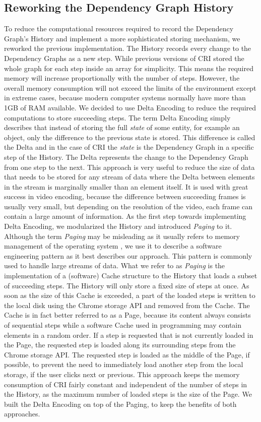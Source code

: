\subsection{Reworking the Dependency Graph History}
To reduce the computational resources required to record the Dependency Graph's History and implement a more sophisticated storing mechanism, we reworked the previous implementation. The History records every change to the Dependency Graphs as a new step. While previous versions of CRI stored the whole graph for each step inside an array for simplicity. This means the required memory will increase proportionally with the number of steps. However, the overall memory consumption will not exceed the limits of the environment except in extreme cases, because modern computer systems normally have more than 1GB of RAM available. We decided to use Delta Encoding to reduce the required computations to store succeeding steps. The term Delta Encoding simply describes that instead of storing the full \emph{state} of some entity, for example an object, only the difference to the previous state is stored. This difference is called the Delta and in the case of CRI the \emph{state} is the Dependency Graph in a specific step of the History. The Delta represents the change to the Dependency Graph from one step to the next. This approach is very useful to reduce the size of data that needs to be stored for any stream of data where the Delta between elements in the stream is marginally smaller than an element itself. It is used with great success in video encoding, because the difference between succeeding frames is usually very small, but depending on the resolution of the video, each frame can contain a large amount of information.
As the first step towards implementing Delta Encoding, we modularized the History and introduced \emph{Paging} to it. Although the term \emph{Paging} may be misleading as it usually refers to memory management of the operating system \cite{PagingWiki}, we use it to describe a software engineering pattern as it best describes our approach. This pattern is commonly used to handle large streams of data. What we refer to as \emph{Paging} is the implementation of a (software) Cache structure to the History that loads a subset of succeeding steps. The History will only store a fixed size of steps at once. As soon as the size of this Cache is exceeded, a part of the loaded steps is written to the local disk using the Chrome storage API and removed from the Cache. The Cache is in fact better referred to as a Page, because its content always consists of sequential steps while a software Cache used in programming may contain elements in a random order. If a step is requested that is not currently loaded in the Page, the requested step is loaded along its surrounding steps from the Chrome storage API. The requested step is loaded as the middle of the Page, if possible, to prevent the need to immediately load another step from the local storage, if the user clicks next or previous. This approach keeps the memory consumption of CRI fairly constant and independent of the number of steps in the History, as the maximum number of loaded steps is the size of the Page. We built the Delta Encoding on top of the Paging, to keep the benefits of both approaches.
